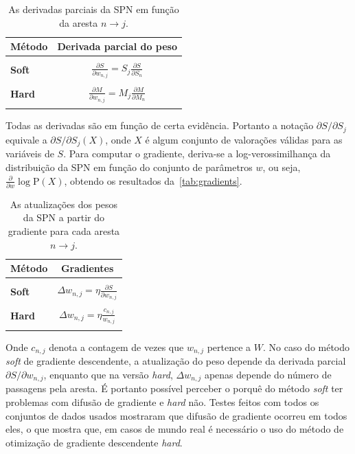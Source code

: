 \documentclass[12pt]{article}
\theoremstyle{plain}
\numberwithin{equation}{section}
\newcommand{\pr}{\text{P}}
\newcommand{\ddspn}[2]{\frac{\partial#1}{\partial#2}}
\newcommand{\iddspn}[2]{\partial#1/\partial#2}
\begin{document}
\begin{table}[h]
  \centering
  \begin{tabular}{l|c}
    \hline
    \multicolumn{1}{c}{\bfseries Método} & \multicolumn{1}{c}{\bfseries Derivada parcial do peso}\\
    \hline & \\
    \textbf{Soft} & \(\displaystyle \ddspn{S}{w_{n,j}} = S_j\ddspn{S}{S_n} \) \\
    & \\
    \textbf{Hard} & \(\displaystyle \ddspn{M}{w_{n,j}} = M_j\ddspn{M}{M_n} \) \\
    & \\
    \hline
  \end{tabular}
  \caption{\label{tab:derivative-weight} As derivadas parciais da SPN em função da aresta $n\to j$.}
\end{table}

Todas as derivadas são em função de certa evidência. Portanto a notação $\iddspn{S}{S_j}$ equivale a
$\iddspn{S}{S_j}(X)$, onde $X$ é algum conjunto de valorações válidas para as variáveis de $S$.
Para computar o gradiente, deriva-se a log-verossimilhança da distribuição da SPN em função do
conjunto de parâmetros $w$, ou seja, $\ddspn{}{w}\log\pr(X)$, obtendo os resultados
da~\autoref{tab:gradients}.

\begin{table}[H]
  \centering
  \begin{tabular}{l|c}
    \hline
    \multicolumn{1}{c}{\bfseries Método} & \multicolumn{1}{c}{\bfseries Gradientes}\\
    \hline & \\
    \textbf{Soft} & \(\displaystyle \Delta w_{n,j} = \eta\ddspn{S}{w_{n,j}} \) \\
    & \\
    \textbf{Hard} & \(\displaystyle \Delta w_{n,j} = \eta \frac{c_{n,j}}{w_{n,j}} \) \\
    & \\
    \hline
  \end{tabular}
  \caption{\label{tab:gradients} As atualizações dos pesos da SPN a partir do gradiente para cada
    aresta $n\to j$.}
\end{table}

Onde $c_{n,j}$ denota a contagem de vezes que $w_{n,j}$ pertence a $W$. No caso do método
\textit{soft} de gradiente descendente, a atualização do peso depende da derivada parcial
$\iddspn{S}{w_{n,j}}$, enquanto que na versão \textit{hard}, $\Delta w_{n,j}$ apenas depende do
número de passagens pela aresta. É portanto possível perceber o porquê do método \textit{soft}
ter problemas com difusão de gradiente e \textit{hard} não. Testes feitos com todos os conjuntos de
dados usados mostraram que difusão de gradiente ocorreu em todos eles, o que mostra que, em
casos de mundo real é necessário o uso do método de otimização de gradiente descendente
\textit{hard}.
\end{document}
